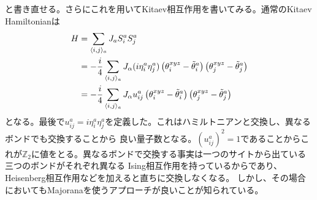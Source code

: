\documentclass[11pt, aps, longbibliography]{article}
\begin{document}
        と書き直せる。さらにこれを用いてKitaev相互作用を書いてみる。通常のKitaev Hamiltonianは
        \begin{align}\label{eq:SO6Majorana-7}
            H &= \sum_{\langle i,j \rangle_a}J_a S_i^a S_j^a \\
            &= -\frac{i}{4} \sum_{\langle i,j \rangle_a}J_\alpha (i\eta_i^a\eta_j^a)\left( \theta_i^{xyz} - \tilde{\theta}_i^a \right)\left( \theta_j^{xyz} - \tilde{\theta}_j^a \right) \notag \\
            &= -\frac{i}{4} \sum_{\langle i,j \rangle_a}J_\alpha u_{ij}^a \left( \theta_i^{xyz} - \tilde{\theta}_i^a \right)\left( \theta_j^{xyz} - \tilde{\theta}_j^a \right)
        \end{align}
        となる。最後で$u_{ij}^a = i\eta_i^a\eta_j^a$を定義した。これはハミルトニアンと交換し、異なるボンドでも交換することから
        良い量子数となる。$(u_{ij}^a)^2=1$であることからこれが$\mathbb{Z}_2$に値をとる。異なるボンドで交換する事実は一つのサイトから出ている三つのボンドがそれぞれ異なる
        Ising相互作用を持っているからであり、Heisenberg相互作用などを加えると直ちに交換しなくなる。
        しかし、その場合においてもMajoranaを使うアプローチが良いことが知られている。
\end{document}

